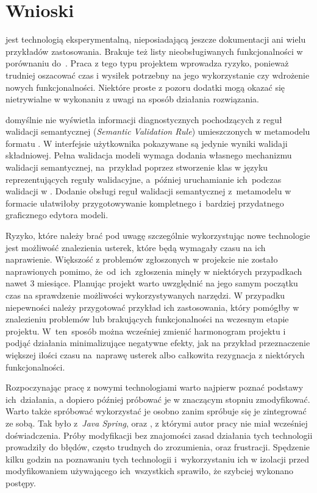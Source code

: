 \section{Wnioski}

\SiriusWeb{} jest technologią eksperymentalną, nieposiadającą jeszcze
dokumentacji ani wielu przykładów zastosowania. Brakuje też listy
nieobsługiwanych funkcjonalności w porównaniu do~\SiriusDesktop{}. Praca z
tego typu projektem wprowadza ryzyko, ponieważ trudniej oszacować czas
i wysiłek potrzebny na jego wykorzystanie czy wdrożenie nowych funkcjonalności.
Niektóre proste z pozoru dodatki mogą okazać się nietrywialne w wykonaniu z
uwagi na sposób działania rozwiązania.

\SiriusWeb{} domyślnie nie wyświetla informacji diagnostycznych pochodzących z
reguł walidacji semantycznej (\emph{Semantic Validation Rule}) umieszczonych w
metamodelu formatu \Ecore{}. W interfejsie użytkownika pokazywane są jedynie
wyniki walidaji składniowej. Pełna walidacja modeli wymaga dodania własnego
mechanizmu walidacji semantycznej, na~przykład poprzez stworzenie klas w języku
\Java{} reprezentujących reguły walidacyjne, a~później uruchamianie ich~podczas
walidacji w \SiriusWeb{}. Dodanie obsługi reguł walidacji semantycznej
z~metamodelu w formacie \Ecore{} ułatwiłoby przygotowywanie kompletnego
i~bardziej przydatnego graficznego edytora modeli.

Ryzyko, które należy brać pod uwagę szczególnie wykorzystując nowe
technologie jest możliwość znalezienia usterek, które będą wymagały czasu na
ich naprawienie. Większość z problemów zgłoszonych w projekcie \SiriusWeb{}
nie zostało naprawionych pomimo, że~od~ich~zgłoszenia minęły w niektórych
przypadkach nawet 3 miesiące. Planując projekt warto uwzględnić na jego samym
początku czas na sprawdzenie możliwości wykorzystywanych narzędzi. W przypadku
niepewności należy przygotować przykład ich zastosowania, który pomógłby w
znalezieniu problemów lub brakujących funkcjonalności na wczesnym etapie
projektu. W~ten~sposób można wcześniej zmienić harmonogram projektu i podjąć
działania minimalizujące negatywne efekty, jak na przykład przeznaczenie
większej ilości czasu na~naprawę usterek albo całkowita rezygnacja z niektórych
funkcjonalności.

Rozpoczynając pracę z nowymi technologiami warto najpierw poznać podstawy
ich~działania, a dopiero później próbować je w znaczącym stopniu zmodyfikować.
Warto także spróbować wykorzystać je osobno zanim spróbuje się je
zintegrować ze sobą. Tak było z~\emph{Java Spring}, \Maven{} oraz
\EMF{}, z którymi autor pracy nie miał wcześniej doświadczenia. Próby
modyfikacji bez znajomości zasad działania tych technologii prowadziły do
błędów, często trudnych do zrozumienia, oraz frustracji. Spędzenie kilku godzin
na poznawaniu tych technologii i~wykorzystaniu ich w izolacji przed
modyfikowaniem \SiriusWeb{} używającego ich~wszystkich sprawiło, że
szybciej wykonano postępy.

